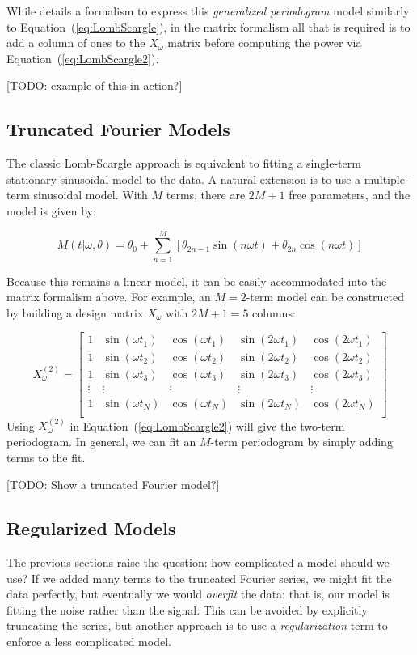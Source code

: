 \documentclass[12pt,preprint]{aastex}
\newcommand{\todo}[1]{{\color{red} [TODO: #1]}}
\newcommand{\Eq}[1]{Equation~(\ref{eq:#1})}
\newcommand{\eq}[1]{\Eq{#1}}
\newcommand{\sectlabel}[1]{\label{sect:#1}}
\begin{document}
While \citet{Zechmeister09} details a formalism to express this {\it generalized periodogram} model similarly to \eq{LombScargle}, in the matrix formalism all that is required is to add a column of ones to the $X_\omega$ matrix before computing the power via \eq{LombScargle2}.

\todo{example of this in action?}

\subsection{Truncated Fourier Models}
\sectlabel{multiterm}
The classic Lomb-Scargle approach is equivalent to fitting a single-term stationary sinusoidal model to the data. A natural extension is to use a multiple-term sinusoidal model. With $M$ terms, there are $2M + 1$ free parameters, and the model is given by:

\begin{equation}
  M(t|\omega,\theta) = \theta_0 + \sum_{n=1}^M \left[\theta_{2n - 1}\sin(n\omega t) + \theta_{2n}\cos(n\omega t)\right]
\end{equation}

Because this remains a linear model, it can be easily accommodated into the matrix formalism above. For example, an $M = 2$-term model can be constructed by building a design matrix $X_\omega$ with $2M + 1 = 5$ columns:

\begin{equation}
X_\omega^{(2)} = \left[
\begin{array}{ccccc}
1 & \sin(\omega t_1) & \cos(\omega t_1) & \sin(2\omega t_1) & \cos(2\omega t_1)\\
1 & \sin(\omega t_2) & \cos(\omega t_2) & \sin(2\omega t_2) & \cos(2\omega t_2)\\
1 & \sin(\omega t_3) & \cos(\omega t_3) & \sin(2\omega t_3) & \cos(2\omega t_3)\\
\vdots & \vdots & \vdots & \vdots & \vdots \\
1 & \sin(\omega t_N) & \cos(\omega t_N) & \sin(2\omega t_N) & \cos(2\omega t_N)\\
\end{array}
\right]
\end{equation}
Using $X_\omega^{(2)}$ in \eq{LombScargle2} will give the two-term periodogram. In general, we can fit an $M$-term periodogram by simply adding terms to the fit.

\todo{Show a truncated Fourier model?}

\subsection{Regularized Models}
\sectlabel{regularization}
The previous sections raise the question: how complicated a model should we use? If we added many terms to the truncated Fourier series, we might fit the data perfectly, but eventually we would {\it overfit} the data: that is, our model is fitting the noise rather than the signal. This can be avoided by explicitly truncating the series, but another approach is to use a {\it regularization} term to enforce a less complicated model.
\end{document}
